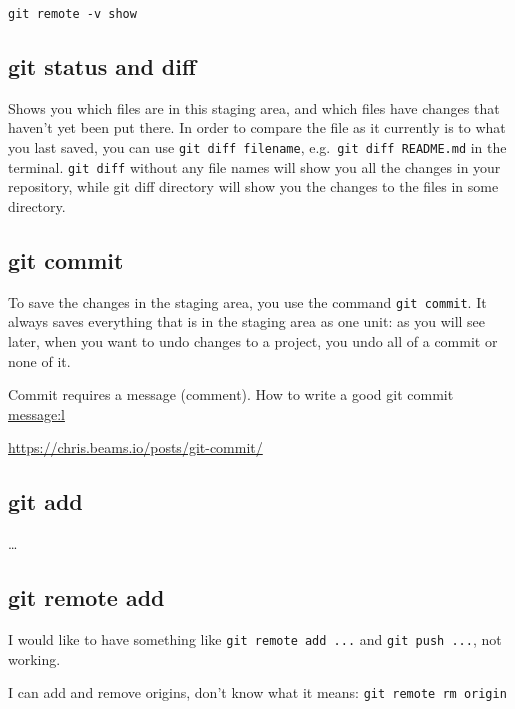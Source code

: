 \documentclass[
]{book}
\begin{document}
\begin{verbatim}
git remote -v show
\end{verbatim}

\hypertarget{git-status-and-diff}{%
\subsection{git status and diff}\label{git-status-and-diff}}

Shows you which files are in this staging area, and which files have changes that haven't yet been put there. In order to compare the file as it currently is to what you last saved, you can use \texttt{git\ diff\ filename}, e.g.~\texttt{git\ diff\ README.md} in the terminal. \texttt{git\ diff} without any file names will show you all the changes in your repository, while git diff directory will show you the changes to the files in some directory.

\hypertarget{git-commit}{%
\subsection{git commit}\label{git-commit}}

To save the changes in the staging area, you use the command \texttt{git\ commit}. It always saves everything that is in the staging area as one unit: as you will see later, when you want to undo changes to a project, you undo all of a commit or none of it.

Commit requires a message (comment). How to write a good git commit \url{message:l}

\url{https://chris.beams.io/posts/git-commit/}

\hypertarget{git-add}{%
\subsection{git add}\label{git-add}}

\ldots{}

\hypertarget{git-remote-add}{%
\subsection{git remote add}\label{git-remote-add}}

I would like to have something like \texttt{git\ remote\ add\ ...} and \texttt{git\ push\ ...}, not working.

I can add and remove origins, don't know what it means: \texttt{git\ remote\ rm\ origin}
\end{document}
